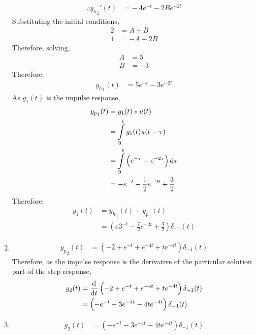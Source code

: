\documentclass[fleqn, a4paper, 11pt, oneside]{amsart}
\theoremstyle{definition}
\theoremstyle{theorem}
\begin{document}
\begin{solution}
\begin{enumerate}[leftmargin=*]
\begin{align*}
				\therefore {{y_h}_1}'(t) & = -A e^{-t} - 2 B e^{-2 t}
			\end{align*}
			Substituting the initial conditions,
			\begin{align*}
				2 & = A + B \\
				1 & = -A - 2 B
			\end{align*}
			Therefore, solving,
			\begin{align*}
				A & = 5 \\
				B & = -3
			\end{align*}
			Therefore,
			\begin{align*}
				{y_h}_1(t) & = 5 e^{-t} - 3 e^{-2 t}
			\end{align*}
			As $g_1(t)$ is the impulse response,
			\begin{align*}
				{y_p}_1(t) & = g_1(t) \ast u(t)                                                     \\
                                           & = \int\limits_{0}^{t} g_1(t) u(t - \tau)                               \\
                                           & = \int\limits_{0}^{t} \left( e^{-\tau} + e^{-2 \tau} \right) \dif \tau \\
                                           & = -e^{-t} - \frac{1}{2} e^{-2 t} + \frac{3}{2}
			\end{align*}
			Therefore,
			\begin{align*}
				y_1(t) & = {y_h}_1(t) + {y_p}_1(t) \\
                                       & = \left( e 3^{-t} - \frac{7}{2} e^{-2 t} + \frac{3}{2} \right) \delta_{-1}(t)
			\end{align*}
		\item
			\begin{align*}
				{y_p}_2(t) & = \left( -2 + e^{-t} + e^{-4 t} + t e^{-4 t} \right) \delta_{-1}(t)
			\end{align*}
			Therefore, as the impulse response is the derivative of the particular solution part of the step response,
			\begin{align*}
				g_2(t) & = \dod{}{t}\left( -2 + e^{-t} + e^{-4 t} + t e^{-4 t} \right) \delta_{-1}(t) \\
                                       & = \left( -e^{-t} - 3 e^{-4 t} - 4 t e^{-4 t} \right) \delta_{-1}(t)
			\end{align*}
		\item
			\begin{align*}
				g_2(t) & = \left( -e^{-t} - 3 e^{-4 t} - 4 t e^{-4 t} \right) \delta_{-1}(t)

\end{align*}
\end{enumerate}
\end{solution}
\end{document}
